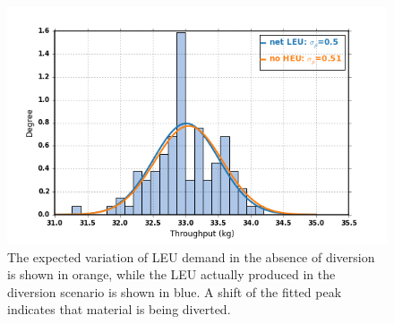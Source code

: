 \begin{figure}
\begin{center}
\includegraphics[natwidth=162bp,natheight=227bp, scale=0.7]{./figs/netLEU_hist_R5_new.png}
\end{center}
\caption{The expected variation of \gls{LEU} demand in the absence of diversion is shown in orange, while the \gls{LEU} actually produced in the diversion scenario is shown in blue.  A shift of the fitted peak indicates that material is being diverted.}
\label{fig:leu_histogram}
\end{figure}





  

